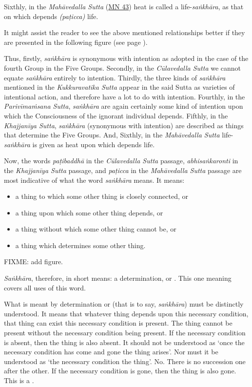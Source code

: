 Sixthly, in the \emph{Mahāvedalla Sutta} (\href{https://suttacentral.net/mn43/en/sujato}{MN 43}) heat is called a life-\emph{saṅkhāra}, as that on which depends \emph{(paṭicca)} life.

It might assist the reader to see the above mentioned relationships better if they are presented in the following figure (see page \pageref{fig-sankhara}).

Thus, firstly, \emph{saṅkhāra} is synonymous with intention as adopted in the case of the fourth Group in the Five Groups. Secondly, in the \emph{Cūlavedalla Sutta} we cannot equate \emph{saṅkhāra} entirely to intention. Thirdly, the three kinds of \emph{saṅkhāra} mentioned in the \emph{Kukkuravatika Sutta} appear in the said Sutta as varieties of intentional action, and therefore have a lot to do with intention. Fourthly, in the \emph{Parivīmaṁsana Sutta}, \emph{saṅkhāra} are again certainly some kind of intention upon which the Consciousness of the ignorant individual depends. Fifthly, in the \emph{Khajjanīya Sutta}, \emph{saṅkhāra} (synonymous with intention) are described as things that determine the Five Groups. And, Sixthly, in the \emph{Mahāvedalla Sutta} life-\emph{saṅkhāra} is given as heat upon which depends life.

Now, the words \emph{paṭibaddhā} in the \emph{Cūlavedalla Sutta} passage, \emph{abhisaṅkaronti} in the \emph{Khajjanīya Sutta} passage, and \emph{paṭicca} in the \emph{Mahāvedalla Sutta} passage are most indicative of what the word \emph{saṅkhāra} means. It means:

\begin{itemize}
\item
  a thing to which some other thing is closely connected, or
\item
  a thing upon which some other thing depends, or
\item
  a thing without which some other thing cannot be, or
\item
  a thing which determines some other thing.
\end{itemize}

\clearpage

\label{fig-sankhara}

FIXME: add figure.

\clearpage

\emph{Saṅkhāra}, therefore, in short means: a determination, or . This one meaning covers all uses of this word.

What is meant by determination or  (that is to say, \emph{saṅkhāra}) must be distinctly understood. It means that whatever thing depends upon this necessary condition, that thing can exist  this necessary condition is present. The thing cannot be present without the necessary condition being present. If the necessary condition is absent, then the thing is also absent. It should not be understood as `once the necessary condition has come and gone the thing arises'. Nor must it be understood as `the necessary condition  the thing'. No. There is no  succession one after the other. If the necessary condition is gone, then the thing is also gone. This is a .


